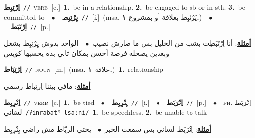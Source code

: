 \documentclass[10pt,a4paper,twoside]{article} %
\begin{document}
\begin{multicols}{2}
{{{{{{{{{\setlength\topsep{0pt}\textbf{\foreignlanguage{arabic}{اِرْتِبِط}}\ {\color{gray}\texttt{//}\color{black}}\ \textsc{verb}\ [c.]\ \textbf{1.}~be in a relationship.  \textbf{2.}~be engaged to sb or in sth.  \textbf{3.}~be committed to\ \ $\bullet$\ \ \setlength\topsep{0pt}\textbf{\foreignlanguage{arabic}{يِرْتِبِط}}\ {\color{gray}\texttt{//}\color{black}}\ [i.]\ \color{gray}(msa. \foreignlanguage{arabic}{يَرْتَبِط بعلاقة أو بمشروع}~\foreignlanguage{arabic}{\textbf{١.}})\color{black}\ \ $\bullet$\ \ \setlength\topsep{0pt}\textbf{\foreignlanguage{arabic}{اِرْتَبَط}}\ {\color{gray}\texttt{//}\color{black}}\ [p.]\  \begin{flushright}\color{gray}\foreignlanguage{arabic}{\textbf{\underline{\foreignlanguage{arabic}{أمثلة}}}: أنا اِرْتَبَطِت بشب من الخليل بس ما صارش نصيب\ $\bullet$\ \  الواحد بدوش يِرْتِبِط بشغل وبعدين يصحله فرصة أحسن بمكان ثاني بده يحسبها كويس}\end{flushright}\color{black}} \vspace{2mm}

{\setlength\topsep{0pt}\textbf{\foreignlanguage{arabic}{اِرْتِبَاط}}\ {\color{gray}\texttt{//}\color{black}}\ \textsc{noun}\ [m.]\ \color{gray}(msa. \foreignlanguage{arabic}{علاقة}~\foreignlanguage{arabic}{\textbf{١.}})\color{black}\ \textbf{1.}~relationship\  \begin{flushright}\color{gray}\foreignlanguage{arabic}{\textbf{\underline{\foreignlanguage{arabic}{أمثلة}}}: مافي بيننا اِرتِباط رسمي}\end{flushright}\color{black}} \vspace{2mm}

{\setlength\topsep{0pt}\textbf{\foreignlanguage{arabic}{اِنْرِبِط}}\ {\color{gray}\texttt{//}\color{black}}\ \textsc{verb}\ [c.]\ \textbf{1.}~be tied\ \ $\bullet$\ \ \setlength\topsep{0pt}\textbf{\foreignlanguage{arabic}{يِنْرِبِط}}\ {\color{gray}\texttt{//}\color{black}}\ [i.]\ \ $\bullet$\ \ \setlength\topsep{0pt}\textbf{\foreignlanguage{arabic}{اِنْرَبَط}}\ {\color{gray}\texttt{//}\color{black}}\ [p.]\ \ $\bullet$\ \ \textsc{ph.} \color{gray} \foreignlanguage{arabic}{اِنْرَبَط لسَاني}\color{black}\ {\color{gray}\texttt{/{\sffamily ʔinrabatˤ lsaːni}/}\color{black}}\ \textbf{1.}~be speechless.  \textbf{2.}~be unable to talk\  \begin{flushright}\color{gray}\foreignlanguage{arabic}{\textbf{\underline{\foreignlanguage{arabic}{أمثلة}}}: اِنْرَبَط لساني بس سمعت الخبر\ $\bullet$\ \  يختي الربّاط مش راضي يِنْرِبِط}\end{flushright}\color{black}} \vspace{2mm}

}}}}}}}}
\end{multicols}
\end{document}
